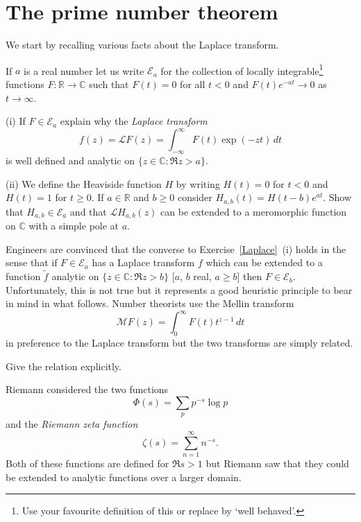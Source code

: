 \section{The prime number theorem} We start by recalling various
facts about the Laplace transform.
\begin{exercise}\label{Laplace}
If $a$ is a real number
let us write ${\mathcal E}_{a}$  for the collection
of locally integrable\footnote{Use your favourite
definition of this or replace by `well behaved'.}
functions $F:{\mathbb R}\rightarrow{\mathbb C}$
such that $F(t)=0$ for all $t<0$ and
$F(t)e^{-at}\rightarrow 0$ as $t\rightarrow\infty$.

(i) If $F\in {\mathcal E}_{a}$ explain why the
\emph{Laplace transform} 
\[f(z)={\mathcal L}F(z)=\int_{-\infty}^{\infty}F(t)\exp(-zt)\,dt\]
is well defined and analytic on $\{z\in{\mathbb C}:\Re z>a\}$.

(ii) We  define the Heaviside function $H$ by
writing $H(t)=0$ for $t<0$ and $H(t)=1$ for $t\geq 0$.
If $a\in {\mathbb R}$ and $b\geq 0$ consider
$H_{a,b}(t)=H(t-b)e^{at}$. Show  that $H_{a,b}\in {\mathcal E}_{a}$
and that ${\mathcal L}H_{a,b}(z)$ can be extended
to a meromorphic function on ${\mathbb C}$ with a simple
pole at $a$. 
\end{exercise}
Engineers are convinced that the converse to 
Exercise~\ref{Laplace}~(i) holds in the sense that if
$F\in {\mathcal E}_{a}$ has a Laplace transform $f$
which can be extended to a function $\tilde{f}$
analytic on $\{z\in{\mathbb C}:\Re z>b\}$ 
[$a$, $b$ real, $a\geq b$] then $F\in {\mathcal E}_{b}$.
Unfortunately, this is not true but it represents
a good heuristic principle to bear in mind in what follows.
Number theorists use the Mellin transform
\[{\mathcal M}F(z)=\int_{0}^{\infty}F(t)t^{z-1}\,dt\]
in preference to the Laplace transform but the
two transforms are simply related.
\begin{exercise} Give the relation explicitly.
\end{exercise}

Riemann considered the two functions
\[\Phi(s)=\sum_{p}p^{-s}\log p\]
and the \emph{Riemann zeta function}
\[\zeta(s)=\sum_{n=1}^{\infty}n^{-s}.\]
Both of these functions are defined for $\Re s>1$ 
but Riemann saw that they could be extended
to analytic functions over a larger domain.


